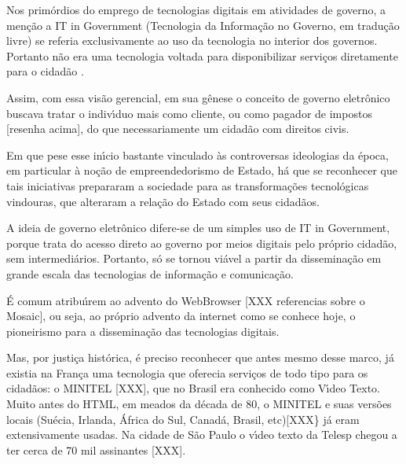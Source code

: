 \documentclass[
12pt,		%
openright,	%
twoside,  %
a4paper,			%
chapter=TITLE,		%
english,			%
french,				%
spanish,			%
brazil				%
]{USPSC-classe/USPSC}
\begin{document}
Nos prim\'ordios do emprego de tecnologias digitais em atividades de governo, a men\c{c}\~ao a \textquotedbl IT in Government (\textquotedbl Tecnologia da Informa\c{c}\~ao no Governo, em tradu\c{c}\~ao livre) se referia exclusivamente ao uso da tecnologia no interior dos governos. Portanto n\~ao era uma tecnologia voltada para disponibilizar servi\c{c}os diretamente para o cidad\~ao .


Assim, com essa vis\~ao gerencial, em sua g\^enese o conceito de governo eletr\^onico buscava tratar o indiv\'{\i}duo mais como \textquotedbl cliente, ou como \textquotedbl pagador de impostos [resenha acima], do que necessariamente um cidad\~ao com direitos civis.


Em que pese esse in\'{\i}cio bastante vinculado \`as controversas ideologias da \'epoca, em particular \`a no\c{c}\~ao de \textquotedbl empreendedorismo de Estado, h\'a que se reconhecer que tais iniciativas prepararam a sociedade para as transforma\c{c}\~oes tecnol\'ogicas vindouras, que alteraram a rela\c{c}\~ao do Estado com seus cidad\~aos.


A ideia de governo eletr\^onico difere-se de um simples uso de \textquotedbl IT in Government, porque trata do acesso direto ao governo por meios digitais pelo pr\'oprio cidad\~ao, sem intermedi\'arios. Portanto, s\'o se tornou vi\'avel a partir da dissemina\c{c}\~ao em grande escala das tecnologias de informa\c{c}\~ao e comunica\c{c}\~ao.


\'E comum atribu\'{\i}rem ao advento do WebBrowser [XXX referencias sobre o Mosaic], ou seja, ao pr\'oprio advento da internet como se conhece hoje, o pioneirismo para a dissemina\c{c}\~ao das tecnologias digitais.


Mas, por justi\c{c}a hist\'orica, \'e preciso reconhecer que antes mesmo desse marco, j\'a existia na Fran\c{c}a uma tecnologia que oferecia servi\c{c}os de todo tipo para os cidad\~aos: o MINITEL [XXX], que no Brasil era conhecido como V\'{\i}deo Texto. Muito antes do HTML, em meados da d\'ecada de 80, o MINITEL e suas vers\~oes locais (Su\'ecia, Irlanda, \'Africa do Sul, Canad\'a, Brasil, etc)[XXX\} j\'a eram extensivamente usadas. Na cidade de S\~ao Paulo o v\'{\i}deo texto da Telesp chegou a ter cerca de 70 mil assinantes [XXX].
\end{document}
